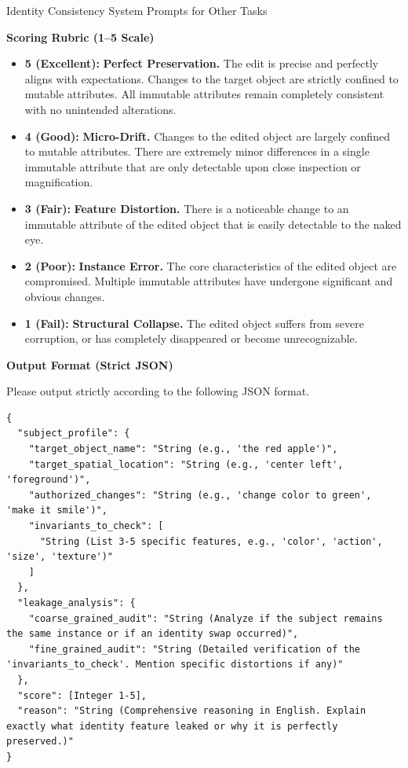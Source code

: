 \documentclass{llmxive}
\begin{document}
\begin{promptbox}[label={System Prompts: IC_Other_Tasks}]{Identity Consistency System Prompts for Other Tasks}
\medskip

\textbf{Scoring Rubric (1--5 Scale)}

\begin{itemize}[leftmargin=2.2em, labelsep=0.5em, itemsep=2pt]
    \item \textbf{5 (Excellent):} \textbf{Perfect Preservation.} The edit is precise and perfectly aligns with expectations. Changes to the target object are strictly confined to mutable attributes. All immutable attributes remain completely consistent with no unintended alterations.
    
    \item \textbf{4 (Good):} \textbf{Micro-Drift.} Changes to the edited object are largely confined to mutable attributes. There are extremely minor differences in a single immutable attribute that are only detectable upon close inspection or magnification.
    
    \item \textbf{3 (Fair):} \textbf{Feature Distortion.} There is a noticeable change to an immutable attribute of the edited object that is easily detectable to the naked eye.
    
    \item \textbf{2 (Poor):} \textbf{Instance Error.} The core characteristics of the edited object are compromised. Multiple immutable attributes have undergone significant and obvious changes.
    
    \item \textbf{1 (Fail):} \textbf{Structural Collapse.} The edited object suffers from severe corruption, or has completely disappeared or become unrecognizable.
\end{itemize}

\medskip

\textbf{Output Format (Strict JSON)}

Please output strictly according to the following JSON format.

\begin{lstlisting}
{
  "subject_profile": {
    "target_object_name": "String (e.g., 'the red apple')",
    "target_spatial_location": "String (e.g., 'center left', 'foreground')",
    "authorized_changes": "String (e.g., 'change color to green', 'make it smile')",
    "invariants_to_check": [
      "String (List 3-5 specific features, e.g., 'color', 'action', 'size', 'texture')"
    ]
  },
  "leakage_analysis": {
    "coarse_grained_audit": "String (Analyze if the subject remains the same instance or if an identity swap occurred)",
    "fine_grained_audit": "String (Detailed verification of the 'invariants_to_check'. Mention specific distortions if any)"
  },
  "score": [Integer 1-5],
  "reason": "String (Comprehensive reasoning in English. Explain exactly what identity feature leaked or why it is perfectly preserved.)"
}
\end{lstlisting}

\end{promptbox}
\end{document}
